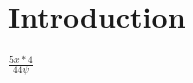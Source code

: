 \documentclass[options]{article}
\begin{document}
\section{Introduction}

$ \frac{5x*4}{44\psi} $
\end{document}

